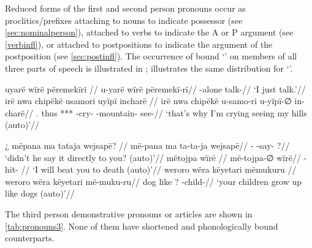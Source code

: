 \documentclass{memoir}
\begin{document}
Reduced forms of the first and second person pronouns occur as
proclitics/prefixes attaching to nouns to indicate possessor (see
\cref{sec:nominalperson}), attached to verbs to indicate the A or P
argument (see \cref{verbinfl}), or attached to postpositions to indicate
the argument of the postposition (see \cref{sec:postinfl}). The
occurrence of bound  `' on members of all three parts of
speech is illustrated in ; 
illustrates the same distribution for  `'.

\pex\label{1marking}    \a     \label{convrisamaj-46}        \begingl
        \glpreamble uyarë wïrë përemekïrï //
        \gla u-yarë wïrë përemekï-rï//
        \glb {}-alone  talk-//
            \glft ‘I just talk.’//  
        \endgl 
    \a     \label{histyarirdi-723}        \begingl
        \glpreamble irë nwa chipëkë usamori uyïpï incharë //
        \gla irë nwa chipëkë u-samo-ri u-yïpï-∅ in-charë//
        \glb {}. thus *** -cry- -mountain- see-//
            \glft ‘that's why I'm crying seeing my hills (auto)’//  
        \endgl 
\xe

\pex\label{2marking}    \a     \label{ctovarmafl-443}        \begingl
        \glpreamble ¿ mëpana ma tataja wejsapë? //
        \gla më-pana ma ta-ta-ja wejsapë//
        \glb {}-  -say- ?//
            \glft ‘didn't he say it directly to you? (auto)’//  
        \endgl 
    \a     \label{histpajirdi-114}        \begingl
        \glpreamble mëtojpa wïrë //
        \gla më-tojpa-∅ wïrë//
        \glb {}-hit- //
            \glft ‘I will beat you to death (auto)’//  
        \endgl 
    \a     \label{histyarirdi-160}        \begingl
        \glpreamble weroro wëra këyetari mëmukuru //
        \gla weroro wëra këyetari më-muku-ru//
        \glb dog like ? -child-//
            \glft ‘your children grow up like dogs (auto)’//  
        \endgl 
\xe

The third person demonstrative pronouns or articles are shown in
\cref{tab:pronouns3}. None of them have shortened and phonologically
bound counterparts.
\end{document}
